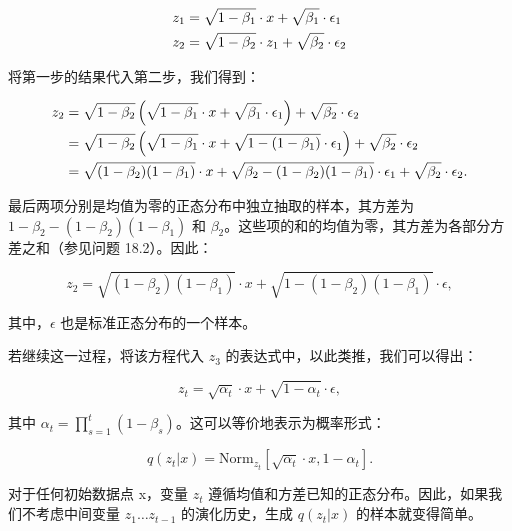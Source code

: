 \documentclass[lang=cn,newtx,10pt,scheme=chinese]{elegantbook}
\begin{document}
\begin{align}
&z_1 = \sqrt{1 - \beta_1} \cdot x + \sqrt{\beta_1} \cdot \epsilon_1 \notag \\
&z_2 = \sqrt{1 - \beta_2} \cdot z_1 + \sqrt{\beta_2} \cdot \epsilon_2 
\end{align} 


将第一步的结果代入第二步，我们得到：

\begin{align}
z_2 &= \sqrt{1 - \beta_2} \left( \sqrt{1 - \beta_1} \cdot x + \sqrt{\beta_1} \cdot \epsilon_1 \right) + \sqrt{\beta_2} \cdot \epsilon_2 \notag \\
&= \sqrt{1 - \beta_2} \left( \sqrt{1 - \beta_1} \cdot x + \sqrt{1 - (1 - \beta_1)} \cdot \epsilon_1 \right) + \sqrt{\beta_2} \cdot \epsilon_2 \notag \\
&= \sqrt{(1 - \beta_2)(1 - \beta_1)} \cdot x + \sqrt{\beta_2 - (1 - \beta_2)(1 - \beta_1)} \cdot \epsilon_1 + \sqrt{\beta_2} \cdot \epsilon_2. 
\end{align} 


最后两项分别是均值为零的正态分布中独立抽取的样本，其方差为 \(1 - \beta_2 - (1 - \beta_2)(1 - \beta_1)\) 和 \(\beta_2\)。这些项的和的均值为零，其方差为各部分方差之和（参见问题 18.2）。因此：

\begin{equation}
z_2 = \sqrt{(1 - \beta_2)(1 - \beta_1)} \cdot x + \sqrt{1 - (1 - \beta_2)(1 - \beta_1)} \cdot \epsilon, 
\end{equation}

其中，\(\epsilon\) 也是标准正态分布的一个样本。


若继续这一过程，将该方程代入 \(z_3\) 的表达式中，以此类推，我们可以得出：

\begin{equation}
z_t = \sqrt{\alpha_t} \cdot x + \sqrt{1 - \alpha_t} \cdot \epsilon, 
\end{equation}

其中 \(\alpha_t = \prod_{s=1}^{t} (1 - \beta_s)\)。这可以等价地表示为概率形式：

\begin{equation}
q(z_t|x) = \text{Norm}_{z_t} \left[ \sqrt{\alpha_t} \cdot x, 1 - \alpha_t \right]. 
\end{equation}

对于任何初始数据点 x，变量 \(z_t\) 遵循均值和方差已知的正态分布。因此，如果我们不考虑中间变量 \(z_1 \ldots z_{t-1}\) 的演化历史，生成 \(q(z_t|x)\) 的样本就变得简单。
\end{document}
